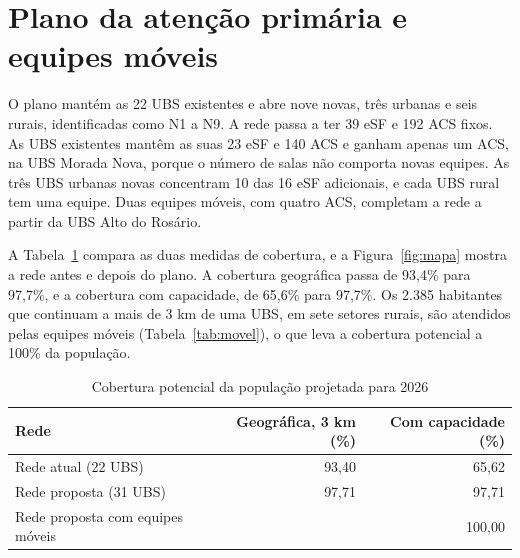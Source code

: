 \section{Plano da atenção primária e equipes móveis}

O plano mantém as 22 UBS existentes e abre nove novas, três urbanas e seis rurais, identificadas como N1
a N9. A rede passa a ter 39 eSF e 192 ACS fixos. As UBS existentes mantêm as suas 23 eSF e 140 ACS e
ganham apenas um ACS, na UBS Morada Nova, porque o número de salas não comporta novas equipes. As três
UBS urbanas novas concentram 10 das 16 eSF adicionais, e cada UBS rural tem uma equipe. Duas equipes
móveis, com quatro ACS, completam a rede a partir da UBS Alto do Rosário.

A Tabela~\ref{tab:cobertura} compara as duas medidas de cobertura, e a Figura~\ref{fig:mapa} mostra a
rede antes e depois do plano. A cobertura geográfica passa de 93,4\% para 97,7\%, e a cobertura com
capacidade, de 65,6\% para 97,7\%. Os 2.385 habitantes que continuam a mais de 3 km de uma UBS, em sete
setores rurais, são atendidos pelas equipes móveis (Tabela~\ref{tab:movel}), o que leva a cobertura
potencial a 100\% da população.

\begin{table}[htbp]\centering
\caption{Cobertura potencial da população projetada para 2026}\label{tab:cobertura}
\begin{tabular}{lrr}\toprule
Rede & Geográfica, 3 km (\%) & Com capacidade (\%)\\\midrule
Rede atual (22 UBS) & 93,40 & 65,62\\
Rede proposta (31 UBS) & 97,71 & 97,71\\
Rede proposta com equipes móveis & & 100,00\\
\bottomrule\end{tabular}
\end{table}

